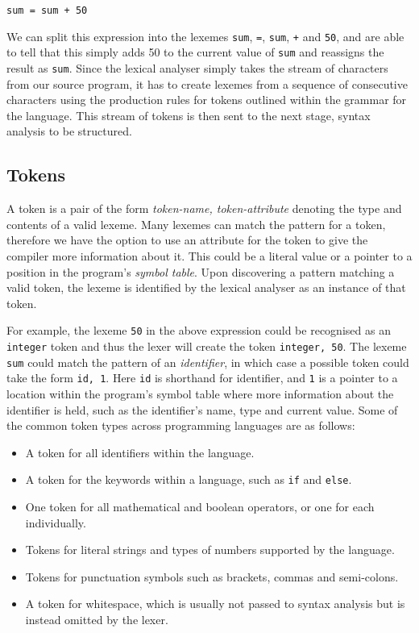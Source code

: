 \documentclass[a4paper, 11pt]{article}
\begin{document}
\begin{center}
	\texttt{sum = sum + 50}
\end{center}

\noindent We can split this expression into the lexemes \texttt{sum}, \texttt{=}, \texttt{sum}, \texttt{+} and \texttt{50}, and are able to tell that this simply adds 50 to the current value of \texttt{sum} and reassigns the result as \texttt{sum}. Since the lexical analyser simply takes the stream of characters from our source program, it has to create lexemes from a sequence of consecutive characters using the production rules for tokens outlined within the grammar for the language. This stream of tokens is then sent to the next stage, syntax analysis to be structured.

\subsection{Tokens}
A token is a pair of the form \textlangle{}\textit{token-name, token-attribute}\textrangle{} denoting the type and contents of a valid lexeme. Many lexemes can match the pattern for a token, therefore we have the option to use an attribute for the token to give the compiler more information about it. This could be a literal value or a pointer to a position in the program's \textit{symbol table}. Upon discovering a pattern matching a valid token, the lexeme is identified by the lexical analyser as an instance of that token. 

For example, the lexeme \texttt{50} in the above expression could be recognised as an \texttt{integer} token and thus the lexer will create the token \textlangle{}\texttt{integer, 50}\textrangle{}. The lexeme \texttt{sum} could match the pattern of an \textit{identifier}, in which case a possible token could take the form \textlangle{}\texttt{id, 1}\textrangle{}. Here \texttt{id} is shorthand for identifier, and \texttt{1} is a pointer to a location within the program's symbol table where more information about the identifier is held, such as the identifier's name, type and current value. Some of the common token types across programming languages are as follows:

\begin{itemize}
\item A token for all identifiers within the language.
\item A token for the keywords within a language, such as \texttt{if} and \texttt{else}.
\item One token for all mathematical and boolean operators, or one for each individually.
\item Tokens for literal strings and types of numbers supported by the language.
\item Tokens for punctuation symbols such as brackets, commas and semi-colons.
\item A token for whitespace, which is usually not passed to syntax analysis but is instead omitted by the lexer.
\end{itemize}
\end{document}
